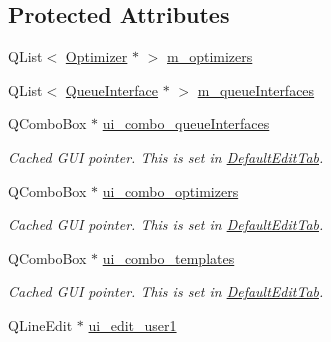 \subsection*{Protected Attributes}
\begin{DoxyCompactItemize}
\item 
Q\+List$<$ \hyperlink{classGlobalSearch_1_1Optimizer}{Optimizer} $\ast$ $>$ \hyperlink{classGlobalSearch_1_1AbstractEditTab_a91f1cbcdf3321b4502aaa11074559eba}{m\+\_\+optimizers}
\item 
Q\+List$<$ \hyperlink{classGlobalSearch_1_1QueueInterface}{Queue\+Interface} $\ast$ $>$ \hyperlink{classGlobalSearch_1_1AbstractEditTab_a364845072bfc0409a145c1cd6b60a60a}{m\+\_\+queue\+Interfaces}
\item 
\hypertarget{classGlobalSearch_1_1AbstractEditTab_af8be46a29c5959f04b5686cf2b222245}{}Q\+Combo\+Box $\ast$ \hyperlink{classGlobalSearch_1_1AbstractEditTab_af8be46a29c5959f04b5686cf2b222245}{ui\+\_\+combo\+\_\+queue\+Interfaces}\label{classGlobalSearch_1_1AbstractEditTab_af8be46a29c5959f04b5686cf2b222245}

\begin{DoxyCompactList}\small\item\em Cached G\+U\+I pointer. This is set in \hyperlink{classGlobalSearch_1_1DefaultEditTab}{Default\+Edit\+Tab}. \end{DoxyCompactList}\item 
\hypertarget{classGlobalSearch_1_1AbstractEditTab_a8145b8270f711300f397d39bfd9e54c4}{}Q\+Combo\+Box $\ast$ \hyperlink{classGlobalSearch_1_1AbstractEditTab_a8145b8270f711300f397d39bfd9e54c4}{ui\+\_\+combo\+\_\+optimizers}\label{classGlobalSearch_1_1AbstractEditTab_a8145b8270f711300f397d39bfd9e54c4}

\begin{DoxyCompactList}\small\item\em Cached G\+U\+I pointer. This is set in \hyperlink{classGlobalSearch_1_1DefaultEditTab}{Default\+Edit\+Tab}. \end{DoxyCompactList}\item 
\hypertarget{classGlobalSearch_1_1AbstractEditTab_afb3ed174abbd52491c89a76a7d749148}{}Q\+Combo\+Box $\ast$ \hyperlink{classGlobalSearch_1_1AbstractEditTab_afb3ed174abbd52491c89a76a7d749148}{ui\+\_\+combo\+\_\+templates}\label{classGlobalSearch_1_1AbstractEditTab_afb3ed174abbd52491c89a76a7d749148}

\begin{DoxyCompactList}\small\item\em Cached G\+U\+I pointer. This is set in \hyperlink{classGlobalSearch_1_1DefaultEditTab}{Default\+Edit\+Tab}. \end{DoxyCompactList}\item 
\hypertarget{classGlobalSearch_1_1AbstractEditTab_a5d584e064980b7b67f48d91b9236401d}{}Q\+Line\+Edit $\ast$ \hyperlink{classGlobalSearch_1_1AbstractEditTab_a5d584e064980b7b67f48d91b9236401d}{ui\+\_\+edit\+\_\+user1}\label{classGlobalSearch_1_1AbstractEditTab_a5d584e064980b7b67f48d91b9236401d}


\end{DoxyCompactItemize}
